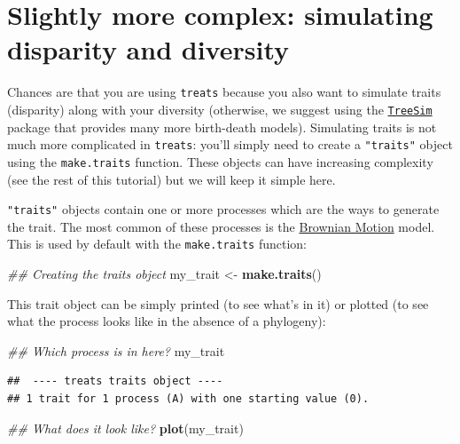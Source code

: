 \documentclass[
]{book}
\newenvironment{Shaded}{\begin{snugshade}}{\end{snugshade}}
\newcommand{\CommentTok}[1]{\textcolor[rgb]{0.56,0.35,0.01}{\textit{#1}}}
\newcommand{\KeywordTok}[1]{\textcolor[rgb]{0.13,0.29,0.53}{\textbf{#1}}}
\newcommand{\NormalTok}[1]{#1}
\newcommand{\StringTok}[1]{\textcolor[rgb]{0.31,0.60,0.02}{#1}}
\begin{document}
\hypertarget{slightly-more-complex-simulating-disparity-and-diversity}{%
\section{Slightly more complex: simulating disparity and diversity}\label{slightly-more-complex-simulating-disparity-and-diversity}}

Chances are that you are using \texttt{treats} because you also want to simulate traits (disparity) along with your diversity (otherwise, we suggest using the \href{https://github.com/tanja819/TreeSim/}{\texttt{TreeSim}} package that provides many more birth-death models).
Simulating traits is not much more complicated in \texttt{treats}: you'll simply need to create a \texttt{"traits"} object using the \texttt{make.traits} function.
These objects can have increasing complexity (see the rest of this tutorial) but we will keep it simple here.

\texttt{"traits"} objects contain one or more processes which are the ways to generate the trait.
The most common of these processes is the \href{https://en.wikipedia.org/wiki/Brownian_motion}{Brownian Motion} model.
This is used by default with the \texttt{make.traits} function:

\begin{Shaded}
\begin{Highlighting}[]
\CommentTok{\#\# Creating the traits object}
\NormalTok{my\_trait \textless{}{-}}\StringTok{ }\KeywordTok{make.traits}\NormalTok{()}
\end{Highlighting}
\end{Shaded}

This trait object can be simply printed (to see what's in it) or plotted (to see what the process looks like in the absence of a phylogeny):

\begin{Shaded}
\begin{Highlighting}[]
\CommentTok{\#\# Which process is in here?}
\NormalTok{my\_trait}
\end{Highlighting}
\end{Shaded}

\begin{verbatim}
##  ---- treats traits object ---- 
## 1 trait for 1 process (A) with one starting value (0).
\end{verbatim}

\begin{Shaded}
\begin{Highlighting}[]
\CommentTok{\#\# What does it look like?}
\KeywordTok{plot}\NormalTok{(my\_trait)}
\end{Highlighting}
\end{Shaded}
\end{document}
